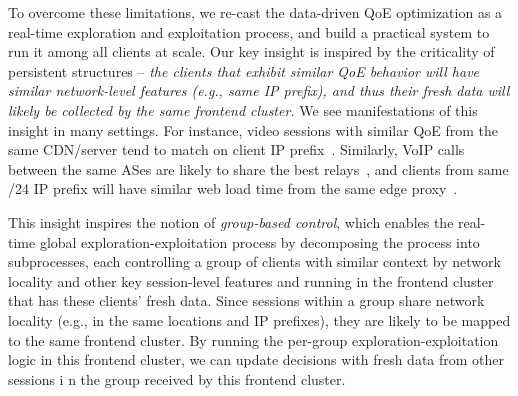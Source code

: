 To overcome these limitations, we re-cast the 
data-driven QoE  optimization as a real-time 
exploration and exploitation process, and build 
a practical system to run it among all clients at 
scale. 
Our key insight is inspired by the criticality of persistent
structures -- {\em the clients that exhibit similar 
QoE behavior will have similar network-level 
features (e.g., same IP prefix), and thus their 
fresh data will likely be collected by the same 
frontend cluster.}
We see manifestations of this insight in many 
settings.
For instance, video sessions with similar QoE 
from the same CDN/server tend to match on 
client IP prefix~\cite{cfa,cs2p}. 
Similarly, VoIP calls between the same ASes 
are likely to share the best
relays~\cite{via},  and clients from  same /24 
IP prefix will have
similar web load time from the same edge 
proxy~\cite{footprint}.

This insight inspires the notion of {\em group-based 
control}, which enables the real-time global 
exploration-exploitation process by decomposing 
the process into subprocesses, each controlling 
a group of clients with similar context by
network locality and other key session-level features 
and running in the frontend cluster that has these 
clients' fresh data.
Since sessions within a group share network locality (e.g., 
in the same locations and IP prefixes), 
they are likely to be mapped to the same frontend cluster.
By running the per-group exploration-exploitation 
logic in this frontend cluster, we can update
decisions with fresh data from other sessions i
n the group received by this frontend cluster.



